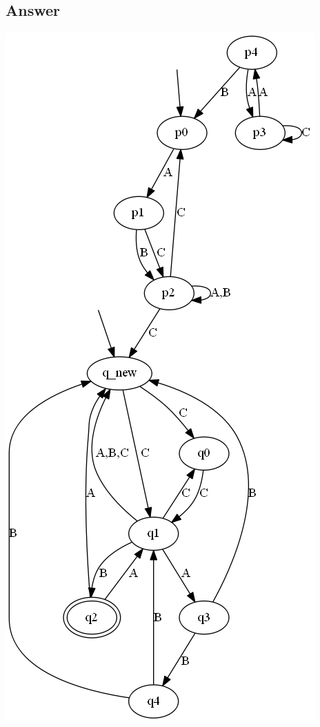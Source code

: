 \documentclass[12pt]{article}
\begin{document}
\subsection*{Answer}
\begin{centering}
	\includegraphics*[scale=0.5]{ex413.png}
\end{centering}
\end{document}

